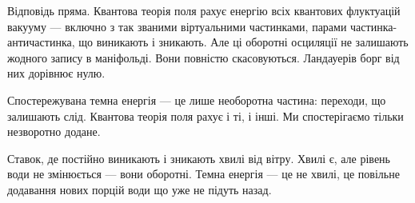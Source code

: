 \documentclass[12pt, a4paper, openany]{book}
\begin{document}
Відповідь пряма. Квантова теорія поля рахує енергію всіх квантових флуктуацій вакууму --- включно з так званими віртуальними частинками, парами частинка-античастинка, що виникають і зникають. Але ці оборотні осциляції не залишають жодного запису в маніфольді. Вони повністю скасовуються. Ландауерів борг від них дорівнює нулю.

Спостережувана темна енергія --- це лише необоротна частина: переходи, що залишають слід. Квантова теорія поля рахує і ті, і інші. Ми спостерігаємо тільки незворотно додане.

\begin{analogybox}
Ставок, де постійно виникають і зникають хвилі від вітру. Хвилі є, але рівень води не змінюється --- вони оборотні. Темна енергія --- це не хвилі, це повільне додавання нових порцій води що уже не підуть назад.
\end{analogybox}
\end{document}
